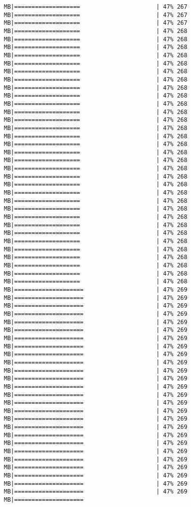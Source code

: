 \documentclass[
]{article}
\begin{document}
\begin{verbatim}
MB|===================                      | 47% 267 MB|===================                      | 47% 267 MB|===================                      | 47% 267 MB|===================                      | 47% 268 MB|===================                      | 47% 268 MB|===================                      | 47% 268 MB|===================                      | 47% 268 MB|===================                      | 47% 268 MB|===================                      | 47% 268 MB|===================                      | 47% 268 MB|===================                      | 47% 268 MB|===================                      | 47% 268 MB|===================                      | 47% 268 MB|===================                      | 47% 268 MB|===================                      | 47% 268 MB|===================                      | 47% 268 MB|===================                      | 47% 268 MB|===================                      | 47% 268 MB|===================                      | 47% 268 MB|===================                      | 47% 268 MB|===================                      | 47% 268 MB|===================                      | 47% 268 MB|===================                      | 47% 268 MB|===================                      | 47% 268 MB|===================                      | 47% 268 MB|===================                      | 47% 268 MB|===================                      | 47% 268 MB|===================                      | 47% 268 MB|===================                      | 47% 268 MB|===================                      | 47% 268 MB|===================                      | 47% 268 MB|===================                      | 47% 268 MB|===================                      | 47% 268 MB|===================                      | 47% 268 MB|===================                      | 47% 268 MB|====================                     | 47% 269 MB|====================                     | 47% 269 MB|====================                     | 47% 269 MB|====================                     | 47% 269 MB|====================                     | 47% 269 MB|====================                     | 47% 269 MB|====================                     | 47% 269 MB|====================                     | 47% 269 MB|====================                     | 47% 269 MB|====================                     | 47% 269 MB|====================                     | 47% 269 MB|====================                     | 47% 269 MB|====================                     | 47% 269 MB|====================                     | 47% 269 MB|====================                     | 47% 269 MB|====================                     | 47% 269 MB|====================                     | 47% 269 MB|====================                     | 47% 269 MB|====================                     | 47% 269 MB|====================                     | 47% 269 MB|====================                     | 47% 269 MB|====================                     | 47% 269 MB|====================                     | 47% 269 MB|====================                     | 47% 269 MB|====================                     | 47% 269 MB|====================                     | 47% 269 MB|====================  
\end{verbatim}
\end{document}
